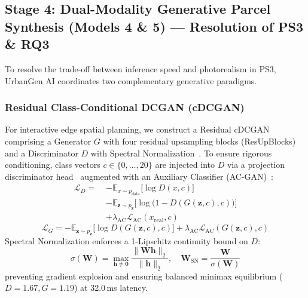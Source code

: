 \documentclass[journal]{IEEEtran}
\begin{document}
\subsection{Stage 4: Dual-Modality Generative Parcel Synthesis (Models 4 \& 5) --- Resolution of PS3 \& RQ3}
To resolve the trade-off between inference speed and photorealism in PS3, UrbanGen AI coordinates two complementary generative paradigms.

\subsubsection{Residual Class-Conditional DCGAN (cDCGAN)}
For interactive edge spatial planning, we construct a Residual cDCGAN comprising a Generator $G$ with four residual upsampling blocks (ResUpBlocks) and a Discriminator $D$ with Spectral Normalization~\cite{miyato2018spectral}. To ensure rigorous conditioning, class vectors $c \in \{0, \dots, 20\}$ are injected into $D$ via a projection discriminator head~\cite{miyato2018cgans} augmented with an Auxiliary Classifier (AC-GAN)~\cite{odena2017conditional}:
\begin{align}
\mathcal{L}_D = \;& -\mathbb{E}_{x \sim p_{\text{data}}}\big[\log D(x, c)\big] \nonumber \\
& -\mathbb{E}_{\mathbf{z} \sim p_{\mathbf{z}}}\big[\log\big(1 - D(G(\mathbf{z}, c), c)\big)\big] \nonumber \\
& + \lambda_{\text{AC}} \mathcal{L}_{\text{AC}}(x_{\text{real}}, c)
\label{eq:gan_d_loss}
\end{align}
\begin{equation}
\mathcal{L}_G = -\mathbb{E}_{\mathbf{z} \sim p_{\mathbf{z}}}\big[\log D(G(\mathbf{z}, c), c)\big] + \lambda_{\text{AC}} \mathcal{L}_{\text{AC}}(G(\mathbf{z}, c), c)
\label{eq:gan_g_loss}
\end{equation}
Spectral Normalization enforces a 1-Lipschitz continuity bound on $D$:
\begin{equation}
\sigma(\mathbf{W}) = \max_{\mathbf{h} \neq \mathbf{0}} \frac{\|\mathbf{W}\mathbf{h}\|_2}{\|\mathbf{h}\|_2}, \quad \mathbf{W}_{\text{SN}} = \frac{\mathbf{W}}{\sigma(\mathbf{W})}
\label{eq:spectral_norm}
\end{equation}
preventing gradient explosion and ensuring balanced minimax equilibrium ($D=1.67, G=1.19$) at 32.0\,ms latency.
\end{document}
